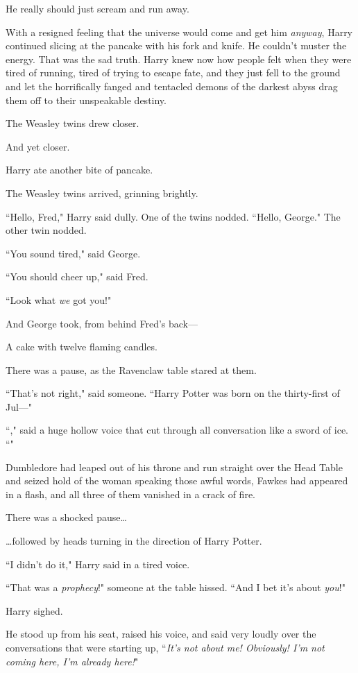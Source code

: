 He really should just scream and run away.

With a resigned feeling that the universe would come and get him \emph{anyway}, Harry continued slicing at the pancake with his fork and knife. He couldn't muster the energy. That was the sad truth. Harry knew now how people felt when they were tired of running, tired of trying to escape fate, and they just fell to the ground and let the horrifically fanged and tentacled demons of the darkest abyss drag them off to their unspeakable destiny.

The Weasley twins drew closer.

And yet closer.

Harry ate another bite of pancake.

The Weasley twins arrived, grinning brightly.

``Hello, Fred," Harry said dully. One of the twins nodded. ``Hello, George." The other twin nodded.

``You sound tired," said George.

``You should cheer up," said Fred.

``Look what \emph{we} got you!"

And George took, from behind Fred's back—

A cake with twelve flaming candles.

There was a pause, as the Ravenclaw table stared at them.

``That's not right," said someone. ``Harry Potter was born on the thirty-first of Jul—"

``," said a huge hollow voice that cut through all conversation like a sword of ice. ``"

Dumbledore had leaped out of his throne and run straight over the Head Table and seized hold of the woman speaking those awful words, Fawkes had appeared in a flash, and all three of them vanished in a crack of fire.

There was a shocked pause{\ldots}

{\ldots}followed by heads turning in the direction of Harry Potter.

``I didn't do it," Harry said in a tired voice.

``That was a \emph{prophecy}!" someone at the table hissed. ``And I bet it's about \emph{you}!"

Harry sighed.

He stood up from his seat, raised his voice, and said very loudly over the conversations that were starting up, ``\emph{It's not about me! Obviously! I'm not coming here, I'm already here!}"

